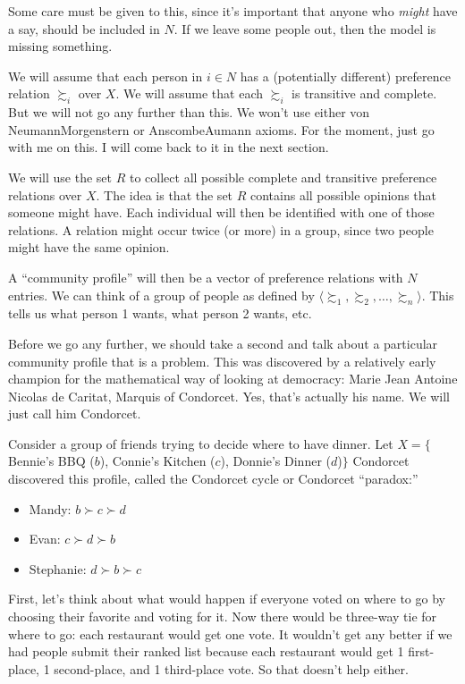 Some care must be given to this, since it's important that anyone who {\it might} have a say, should be included in $N$.  If we leave some people out, then the model is missing something.

We will assume that each person in $i \in N$ has a (potentially different) preference relation $\succsim_i$ over $X$.  We will assume that each $\succsim_i$ is transitive and complete.  But we will not go any further than this. We won't use either von Neumann\breakslash Morgenstern or Anscombe\breakslash Aumann axioms.  For the moment, just go with me on this. I will come back to it in the next section.

We will use the set $R$ to collect all possible complete and transitive preference relations over $X$.  The idea is that the set $R$ contains all possible opinions that someone might have.  Each individual will then be identified with one of those relations.  A relation might occur twice (or more) in a group, since two people might have the same opinion.  

A ``community profile'' will then be a vector of preference relations with $N$ entries.  We can think of a group of people as defined by $\langle \succsim_1, \succsim_2, \dots, \succsim_n\rangle$.  This tells us what person 1 wants, what person 2 wants, etc.

Before we go any further, we should take a second and talk about a particular community profile that is a problem.  This was discovered by a relatively early champion for the mathematical way of looking at democracy: Marie Jean Antoine Nicolas de Caritat, Marquis of Condorcet.  Yes, that's actually his name.  We will just call him Condorcet.

Consider a group of friends trying to decide where to have dinner.  Let $X = \{$ Bennie's BBQ ($b$), Connie's Kitchen ($c$), Donnie's Dinner ($d$)$\}$  Condorcet discovered this profile, called the Condorcet cycle or Condorcet ``paradox:''
\begin{itemize}
    \item Mandy: $b \succ c \succ d$
    \item Evan: $c \succ d \succ b$
    \item Stephanie: $d \succ b \succ c$
\end{itemize}

First, let's think about what would happen if everyone voted on where to go by choosing their favorite and voting for it.  Now there would be three-way tie for where to go: each restaurant would get one vote.  It wouldn't get any better if we had people submit their ranked list because each restaurant would get 1 first-place, 1 second-place, and 1 third-place vote. So that doesn't help either.

